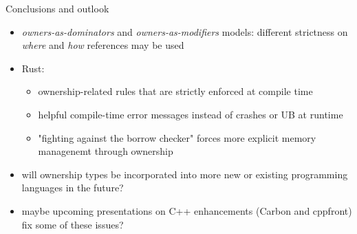 \documentclass[handout]{beamer}
\begin{document}
\begin{frame}{Conclusions and outlook}
\begin{itemize}
  \item \emph{owners-as-dominators} and \emph{owners-as-modifiers} models: different strictness on \emph{where} and \emph{how} references may be used
  \item Rust: 
  \begin{itemize}
    \item ownership-related rules that are strictly enforced at compile time
    \item helpful compile-time error messages instead of crashes or UB at runtime
    \item "fighting against the borrow checker" forces more explicit memory managenemt through ownership
  \end{itemize}
  \item will ownership types be incorporated into more new or existing programming languages in the future?
  \item maybe upcoming presentations on C++ enhancements (Carbon and cppfront) fix some of these issues?
\end{itemize}
\end{frame}




\end{document}
